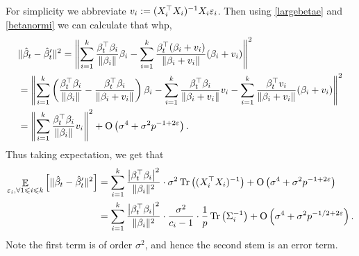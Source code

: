 For simplicity we abbreviate $v_i:=(X_i^\top X_i)^{-1}X_i {\varepsilon}_i$. Then using \eqref{largebetae} and \eqref{betanormi} we can calculate that whp,
\begin{align*}
&\|\hat \beta_t - \hat\beta_t'\|^2= \left\|\sum_{i=1}^k\frac{\beta_t^\top \beta_i}{\|\beta_i\|} \beta_i - \sum_{i=1}^k\frac{\beta_t^\top (\beta_i + v_i)}{ \|\beta_i +v_i\| }(\beta_i + v_i) \right\|^2 \\
&=  \left\|\sum_{i=1}^k\left(\frac{\beta_t^\top \beta_i}{\|\beta_i\|}-\frac{\beta_t^\top \beta_i}{\|\beta_i+v_i\|} \right)\beta_i - \sum_{i=1}^k\frac{\beta_t^\top \beta_i }{ \|\beta_i+v_i\| } v_i - \sum_{i=1}^k\frac{\beta_t^\top v_i}{ \|\beta_i +v_i\| } (\beta_i+v_i) \right\|^2 \\
&= \left\| \sum_{i=1}^k\frac{\beta_t^\top \beta_i }{ \|\beta_i\|} v_i\right\|^2 + \operatorname{O}\left(\sigma^4+\sigma^2 p^{-1+2{\varepsilon}}\right).
\end{align*}
Thus taking expectation, we get that 
\begin{align*}
\mathop{\mathbb{E}}_{\varepsilon_i, \forall 1\leqslant i\leqslant k}\left[ \|\hat \beta_t - \hat\beta_t'\|^2 \right]&=   \sum_{i=1}^k\frac{\left|\beta_t^\top \beta_i \right|^2}{ \|\beta_i\|^2 } \cdot \sigma^2 \operatorname{Tr} \left( (X_i^\top X_i)^{-1}\right) + \operatorname{O}\left(\sigma^4+\sigma^2 p^{-1+2{\varepsilon}}\right) \\
 &= \sum_{i=1}^k\frac{\left|\beta_t^\top \beta_i \right|^2}{ \|\beta_i\|^2 } \cdot \frac{\sigma^2}{c_i-1}\cdot \frac1p\operatorname{Tr} \left(\Sigma_i^{-1}\right) + \operatorname{O}\left(\sigma^4+\sigma^2 p^{-1/2+2{\varepsilon}}\right) .
\end{align*}
Note the first term is of order $\sigma^2$, and hence the second stem is an error term.



